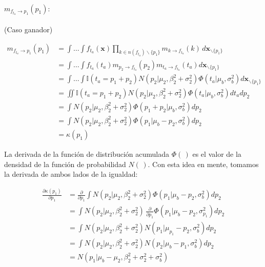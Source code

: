\documentclass[11pt,twoside,spanish]{report} %
\begin{document}
\paragraph{$m_{f_{t_a} \rightarrow p_1}(p_1):$} (Caso ganador)

\begin{equation}
	\begin{split}
		m_{f_{t_a} \rightarrow p_1}(p_1)  & = \int \dots \int f_{t_a}(\textbf{x}) \prod_{k\in n(f_{t_a})\backslash\{p_1\}} m_{k\rightarrow f_{t_a}}(k) \, d\textbf{x}_{\backslash \{p_1\} }  \\
		&= \int \dots \int f_{t_a}(t_a) m_{p_2\rightarrow f_{t_a}}(p_2)m_{t_a\rightarrow f_{t_a}}(t_a)d\textbf{x}_{\backslash \{p_1\} }\\
		&= \int \dots \int \mathbb{I}( t_a = p_1 + p_2) N(p_2| \mu_2, \beta_2^2 + \sigma_2^2 )  \Phi (t_a| \mu_b , \sigma_b^2 )  d\textbf{x}_{\backslash \{p_1\} }\\
		&= \iint \mathbb{I}( t_a = p_1 + p_2)  N(p_2| \mu_2, \beta_2^2 + \sigma_2^2 )  \Phi (t_a| \mu_b , \sigma_b^2 )  dt_a dp_2 \\
		&= \int   N(p_2| \mu_2, \beta_2^2 + \sigma_2^2 )  \Phi (p_1 + p_2| \mu_b , \sigma_b^2 )  dp_2 \\
		&= \int  N(p_2| \mu_2, \beta_2^2 + \sigma_2^2 )  \Phi (p_1 | \mu_b - p_2 , \sigma_b^2)  dp_2 \\
		&= \kappa(p_1)
	\end{split}
\end{equation}

La derivada de la funci\'on de distribuci\'on acumulada $\Phi(\,)$ es el valor de la densidad de la funci\'on de probabilidad $N(\,)$. Con esta idea en mente, tomamos la derivada de ambos lados de la igualdad:

\begin{equation}\label{eq:ta-p_derivada}
	\begin{split}
		\frac{\partial\kappa(p_1)}{\partial p_1} &= \frac{\partial}{\partial p_1} \int  N(p_2| \mu_{2}, \beta_2^2 + \sigma_{2}^2 )    \Phi (p_1 | \mu_b -p_2 ,  \sigma_{b}^2 )  dp_2 \\
		&= \int  N(p_2| \mu_2,\beta_2^2 + \sigma_2^2 ) \, \frac{\partial}{\partial p_1} \Phi (p_1| \mu_{b} - p_2, \sigma_{p_1}^2 )   dp_2   \\
		&= \int  N(p_2| \mu_{2}, \beta_2^2 +\sigma_{2}^2 )  N(p_1| \mu_{p_1} -p_2 , \sigma_b^2)   dp_2  \\
		& = \int  N(p_2| \mu_{2}, \beta_2^2 +\sigma_2^2 )  N(p_2| \mu_{b}  -p_1 , \sigma_b^2)   dp_2  \\
		&= N(p_1| \mu_{b} - \mu_{2}, \beta_2^2+\sigma_2^2 + \sigma_{b}^2)
	\end{split}
\end{equation}
\end{document}
